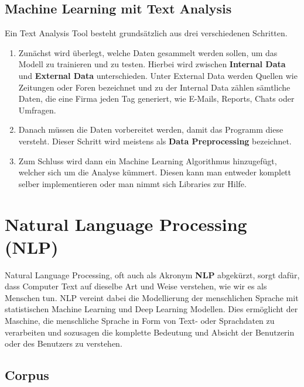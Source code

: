 \subsection{Machine Learning mit Text Analysis}\label{subsec:machine-learning-with-text-analysis}

Ein Text Analysis Tool besteht grundsätzlich aus drei verschiedenen Schritten.

\begin{enumerate}
    \item Zunächst wird überlegt, welche Daten gesammelt werden sollen, um das Modell zu trainieren und zu testen.
    Hierbei wird zwischen \textbf{Internal Data} und \textbf{External Data} unterschieden.
    Unter External Data werden Quellen wie Zeitungen oder Foren bezeichnet und zu der Internal Data zählen sämtliche Daten, die eine Firma jeden Tag generiert, wie E-Mails, Reports, Chats oder Umfragen.
    \item Danach müssen die Daten vorbereitet werden, damit das Programm diese versteht.
    Dieser Schritt wird meistens als \textbf{Data Preprocessing} bezeichnet.
    \item Zum Schluss wird dann ein Machine Learning Algorithmus hinzugefügt, welcher sich um die Analyse kümmert.
    Diesen kann man entweder komplett selber implementieren oder man nimmt sich Libraries zur Hilfe.\cite{machineLearningTextAnalysis}
\end{enumerate}

\section{Natural Language Processing (NLP)}\label{sec:natural-language-processing}

Natural Language Processing, oft auch als Akronym \textbf{NLP} abgekürzt, sorgt dafür, dass Computer Text auf dieselbe Art und Weise verstehen, wie wir es als Menschen tun.
NLP vereint dabei die Modellierung der menschlichen Sprache mit statistischen Machine Learning und Deep Learning Modellen.
Dies ermöglicht der Maschine, die menschliche Sprache in Form von Text- oder Sprachdaten zu verarbeiten und sozusagen die komplette Bedeutung und Absicht der Benutzerin oder des Benutzers zu verstehen.\cite{naturalLanguageProcessingIBM}

\subsection{Corpus}\label{subsec:corpus}

